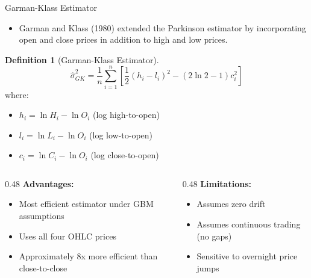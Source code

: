 \documentclass[9pt, aspectratio=169, t]{beamer}
\theoremstyle{definition}
\newtheorem{defn}{Definition}
\begin{document}
\begin{frame}{Garman-Klass Estimator}

\begin{itemize}
    \item Garman and Klass (1980) extended the Parkinson estimator by incorporating open and close prices in addition to high and low prices.
\end{itemize}

\vspace{0.2cm}

\begin{defn}[Garman-Klass Estimator]
\[
\hat{\sigma}_{GK}^2 = \frac{1}{n}\sum_{i=1}^{n}\left[\frac{1}{2}(h_i - l_i)^2 - (2\ln 2 - 1)c_i^2\right]
\]
where:
\begin{itemize}
    \item $h_i = \ln H_i - \ln O_i$ (log high-to-open)
    \item $l_i = \ln L_i - \ln O_i$ (log low-to-open)
    \item $c_i = \ln C_i - \ln O_i$ (log close-to-open)
\end{itemize}
\end{defn}

\vspace{0.2cm}

\begin{columns}[T]
\begin{column}{0.48\textwidth}
\textbf{Advantages:}
\begin{itemize}
    \item Most efficient estimator under GBM assumptions
    \item Uses all four OHLC prices
    \item Approximately 8x more efficient than close-to-close
\end{itemize}
\end{column}
\begin{column}{0.48\textwidth}
\textbf{Limitations:}
\begin{itemize}
    \item Assumes zero drift
    \item Assumes continuous trading (no gaps)
    \item Sensitive to overnight price jumps
\end{itemize}
\end{column}
\end{columns}

\end{frame}
\end{document}
